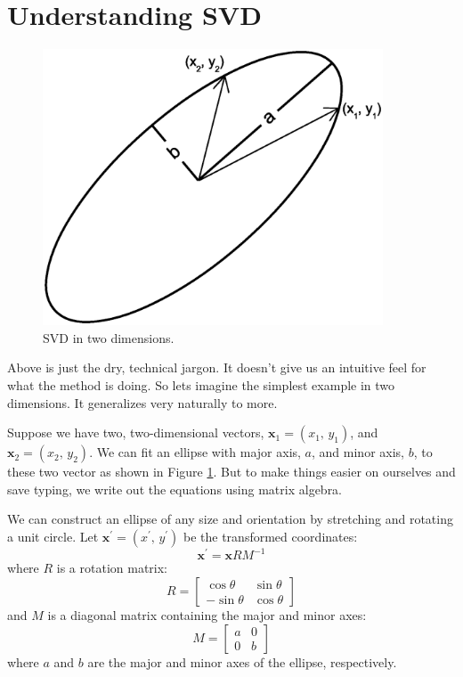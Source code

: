 \documentclass{article}
\renewcommand{\vec}[1]{\boldsymbol{#1}}
\begin{document}
\section{Understanding SVD}

\begin{figure}
	\includegraphics[width=0.9\textwidth]{svd_example}
	\caption{SVD in two dimensions.}
	\label{ellipse}
\end{figure}

Above is just the dry, technical jargon.
It doesn't give us an intuitive feel for what the method is doing.
So lets imagine the simplest example in two dimensions.
It generalizes very naturally to more.

Suppose we have two, two-dimensional vectors, $\vec x_1=(x_1,\,y_1)$, and 
$\vec x_2=(x_2,\,y_2)$.
We can fit an ellipse with major axis, $a$, and minor axis, $b$, to these two
vector as shown in Figure \ref{ellipse}.
But to make things easier on ourselves and save typing, we write out the 
equations using matrix algebra.

We can construct an ellipse of any size and orientation by stretching and
rotating a unit circle.
Let $\vec x^\prime=(x^\prime,\,y^\prime)$ be the transformed coordinates:
\begin{equation}
	\vec x^\prime = \vec x R M^{-1}
\end{equation}
where $R$ is a rotation matrix:
\begin{equation}
	R = \left [ \begin{array}{ll}
			\cos \theta & \sin \theta \\
			-\sin \theta & \cos \theta
	\end{array} \right ]
\end{equation}
and $M$ is a diagonal matrix containing the
major and minor axes:
\begin{equation}
	M = \left [ \begin{array}{rr}
			a & 0 \\
			0 & b
	\end{array} \right ]
\end{equation}
where $a$ and $b$ are the major and minor axes of the ellipse, respectively.
\end{document}
